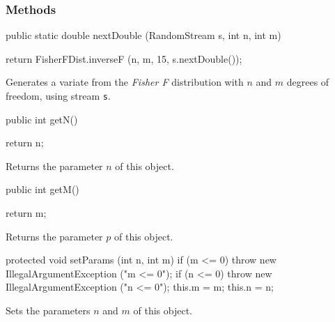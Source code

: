 \subsubsection* {Methods}
\begin{code}
 
   public static double nextDouble (RandomStream s, int n, int m)\begin{hide} {
      return FisherFDist.inverseF (n, m, 15, s.nextDouble());
   }\end{hide}
\end{code}
\begin{tabb} Generates a variate from the \emph{Fisher F} distribution with
   $n$ and $m$ degrees of freedom, using stream \texttt{s}.
\end{tabb}
\begin{code}

   public int getN()\begin{hide} {
      return n;
   }
   \end{hide}
\end{code}
\begin{tabb} Returns the parameter $n$ of this object.
\end{tabb}
\begin{code}

   public int getM()\begin{hide} {
      return m;
   }
   \end{hide}
\end{code}
\begin{tabb} Returns the parameter $p$ of this object.
\end{tabb}
\begin{hide}\begin{code}

   protected void setParams (int n, int m) {
      if (m <= 0)
         throw new IllegalArgumentException ("m <= 0");
      if (n <= 0)
         throw new IllegalArgumentException ("n <= 0");
      this.m = m;
      this.n = n;
   }
\end{code}
\begin{tabb} Sets the parameters $n$ and $m$ of this object.
\end{tabb}
\begin{code}
}\end{code}
\end{hide}
